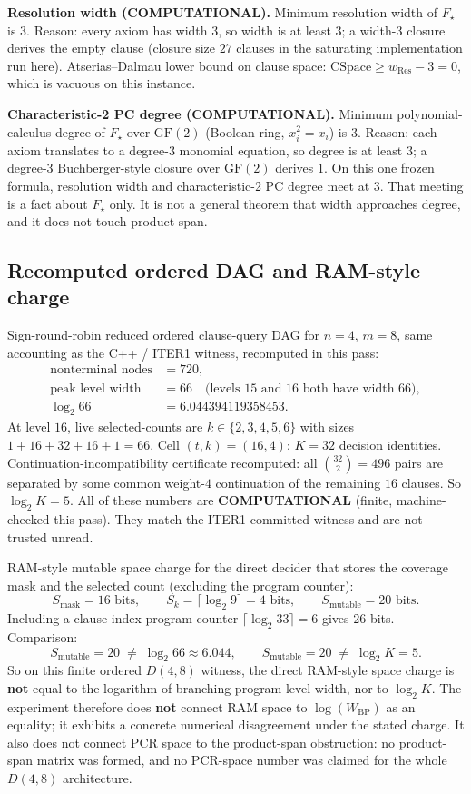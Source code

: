 \documentclass[11pt]{article}
\begin{document}
\textbf{Resolution width (COMPUTATIONAL).}
Minimum resolution width of \(F_\star\) is \(3\).
Reason: every axiom has width \(3\), so width is at least \(3\); a width-\(3\) closure derives the empty clause (closure size \(27\) clauses in the saturating implementation run here).
Atserias--Dalmau lower bound on clause space: \(\mathrm{CSpace}\ge w_{\mathrm{Res}}-3=0\), which is vacuous on this instance.

\textbf{Characteristic-2 PC degree (COMPUTATIONAL).}
Minimum polynomial-calculus degree of \(F_\star\) over \(\mathrm{GF}(2)\) (Boolean ring, \(x_i^2=x_i\)) is \(3\).
Reason: each axiom translates to a degree-\(3\) monomial equation, so degree is at least \(3\); a degree-\(3\) Buchberger-style closure over \(\mathrm{GF}(2)\) derives \(1\).
On this one frozen formula, resolution width and characteristic-2 PC degree meet at \(3\).
That meeting is a fact about \(F_\star\) only.
It is not a general theorem that width approaches degree, and it does not touch product-span.

\subsection*{Recomputed ordered DAG and RAM-style charge}
Sign-round-robin reduced ordered clause-query DAG for \(n=4\), \(m=8\), same accounting as the C++ / ITER1 witness, recomputed in this pass:
\begin{align*}
\text{nonterminal nodes}&=720,\\
\text{peak level width}&=66
\quad\text{(levels \(15\) and \(16\) both have width \(66\))},\\
\log_2 66 &= 6.044394119358453.
\end{align*}
At level \(16\), live selected-counts are \(k\in\{2,3,4,5,6\}\) with sizes \(1+16+32+16+1=66\).
Cell \((t,k)=(16,4)\): \(K=32\) decision identities.
Continuation-incompatibility certificate recomputed: all \(\binom{32}{2}=496\) pairs are separated by some common weight-\(4\) continuation of the remaining \(16\) clauses.
So \(\log_2 K=5\).
All of these numbers are \textbf{COMPUTATIONAL} (finite, machine-checked this pass). They match the ITER1 committed witness and are not trusted unread.

RAM-style mutable space charge for the direct decider that stores the coverage mask and the selected count (excluding the program counter):
\[
S_{\mathrm{mask}}=16\text{ bits},\qquad
S_k=\lceil\log_2 9\rceil=4\text{ bits},\qquad
S_{\mathrm{mutable}}=20\text{ bits}.
\]
Including a clause-index program counter \(\lceil\log_2 33\rceil=6\) gives \(26\) bits.
Comparison:
\[
S_{\mathrm{mutable}}=20 \;\neq\; \log_2 66\approx 6.044,\qquad
S_{\mathrm{mutable}}=20 \;\neq\; \log_2 K=5.
\]
So on this finite ordered \(D(4,8)\) witness, the direct RAM-style space charge is \textbf{not} equal to the logarithm of branching-program level width, nor to \(\log_2 K\).
The experiment therefore does \textbf{not} connect RAM space to \(\log(W_{\mathrm{BP}})\) as an equality; it exhibits a concrete numerical disagreement under the stated charge.
It also does not connect PCR space to the product-span obstruction: no product-span matrix was formed, and no PCR-space number was claimed for the whole \(D(4,8)\) architecture.
\end{document}
